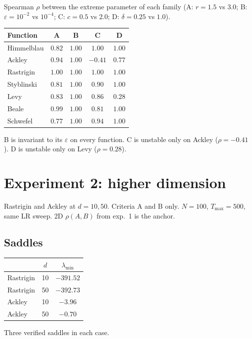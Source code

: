 \documentclass[11pt]{article}
\begin{document}
Spearman $\rho$ between the extreme parameter of each family
(A: $r=1.5$ vs $3.0$; B: $\varepsilon=10^{-2}$ vs $10^{-4}$;
C: $c=0.5$ vs $2.0$; D: $\delta=0.25$ vs $1.0$).

\begin{center}
\begin{tabular}{lcccc}
\toprule
Function & A & B & C & D \\
\midrule
Himmelblau & $0.82$ & $1.00$ & $1.00$ & $1.00$ \\
Ackley     & $0.94$ & $1.00$ & $-0.41$ & $0.77$ \\
Rastrigin  & $1.00$ & $1.00$ & $1.00$ & $1.00$ \\
Styblinski & $0.81$ & $1.00$ & $0.90$ & $1.00$ \\
Levy       & $0.83$ & $1.00$ & $0.86$ & $0.28$ \\
Beale      & $0.99$ & $1.00$ & $0.81$ & $1.00$ \\
Schwefel   & $0.77$ & $1.00$ & $0.94$ & $1.00$ \\
\bottomrule
\end{tabular}
\end{center}
B is invariant to its $\varepsilon$ on every function. C is unstable only on
Ackley ($\rho=-0.41$). D is unstable only on Levy ($\rho=0.28$).

\section{Experiment 2: higher dimension}

Rastrigin and Ackley at $d=10,50$. Criteria A and B only.
$N=100$, $T_{\max}=500$, same LR sweep. 2D $\rho(A,B)$ from exp.~1 is the
anchor.

\subsection{Saddles}

\begin{center}
\begin{tabular}{lcc}
\toprule
 & $d$ & $\lambda_{\min}$ \\
\midrule
Rastrigin & 10 & $-391.52$ \\
Rastrigin & 50 & $-392.73$ \\
Ackley    & 10 & $-3.96$ \\
Ackley    & 50 & $-0.70$ \\
\bottomrule
\end{tabular}
\end{center}
Three verified saddles in each case.
\end{document}
